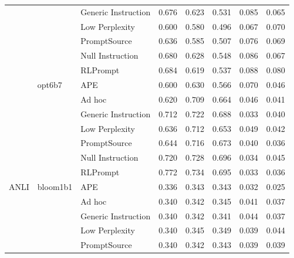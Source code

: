 \begin{supertabular}{lllrrrrr}
              &        & Generic Instruction &            0.676 &           0.623 &          0.531 &        0.085 &    0.065 \\
              &        & Low Perplexity &            0.600 &           0.580 &          0.496 &        0.067 &    0.070 \\
              &        & PromptSource &            0.636 &           0.585 &          0.507 &        0.076 &    0.069 \\
              &        & Null Instruction &            0.680 &           0.628 &          0.548 &        0.086 &    0.067 \\
              &        & RLPrompt &            0.684 &           0.619 &          0.537 &        0.088 &    0.080 \\
              & opt6b7 & APE &            0.600 &           0.630 &          0.566 &        0.070 &    0.046 \\
              &        & Ad hoc &            0.620 &           0.709 &          0.664 &        0.046 &    0.041 \\
              &        & Generic Instruction &            0.712 &           0.722 &          0.688 &        0.033 &    0.040 \\
              &        & Low Perplexity &            0.636 &           0.712 &          0.653 &        0.049 &    0.042 \\
              &        & PromptSource &            0.644 &           0.716 &          0.673 &        0.040 &    0.036 \\
              &        & Null Instruction &            0.720 &           0.728 &          0.696 &        0.034 &    0.045 \\
              &        & RLPrompt &            0.772 &           0.734 &          0.695 &        0.033 &    0.036 \\
ANLI & bloom1b1 & APE &            0.336 &           0.343 &          0.343 &        0.032 &    0.025 \\
              &        & Ad hoc &            0.340 &           0.342 &          0.345 &        0.041 &    0.037 \\
              &        & Generic Instruction &            0.340 &           0.342 &          0.341 &        0.044 &    0.037 \\
              &        & Low Perplexity &            0.340 &           0.345 &          0.349 &        0.039 &    0.044 \\
              &        & PromptSource &            0.340 &           0.342 &          0.343 &        0.039 &    0.039 \\

\end{supertabular}
